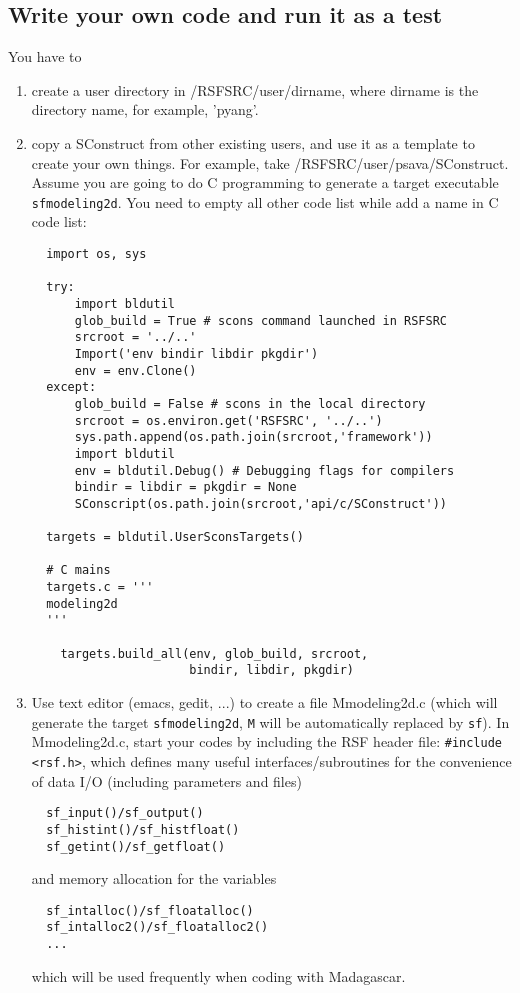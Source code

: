 \subsection{Write your own code and run it as a test}
You have to
\begin{enumerate}
 \item create a user directory in /RSFSRC/user/dirname, where dirname is the directory name, for example, 'pyang'.
 \item copy a SConstruct from other existing users, and use it as a template to create your own things. For example, take /RSFSRC/user/psava/SConstruct. Assume you are going to do C programming to generate a target executable \texttt{sfmodeling2d}. You need to empty all other code list while add a name in C code list:
\lstset{language=python,numbers=left,numberstyle=\tiny,showstringspaces=false,frame=single}
\begin{lstlisting}
  import os, sys

  try:
      import bldutil
      glob_build = True # scons command launched in RSFSRC
      srcroot = '../..' 
      Import('env bindir libdir pkgdir')
      env = env.Clone()
  except:
      glob_build = False # scons in the local directory
      srcroot = os.environ.get('RSFSRC', '../..')
      sys.path.append(os.path.join(srcroot,'framework'))
      import bldutil
      env = bldutil.Debug() # Debugging flags for compilers
      bindir = libdir = pkgdir = None
      SConscript(os.path.join(srcroot,'api/c/SConstruct'))

  targets = bldutil.UserSconsTargets()

  # C mains
  targets.c = '''
  modeling2d
  '''

    targets.build_all(env, glob_build, srcroot, 
                      bindir, libdir, pkgdir)
\end{lstlisting}

 \item Use text editor (emacs, gedit, ...) to create a file Mmodeling2d.c (which will generate the target \texttt{sfmodeling2d}, \texttt{M} will be automatically replaced by \texttt{sf}). In Mmodeling2d.c, start your codes by  including the RSF header file: \texttt{\#include <rsf.h>}, which defines many useful interfaces/subroutines for the convenience of data I/O (including parameters and files)
 \begin{verbatim}
  sf_input()/sf_output()
  sf_histint()/sf_histfloat()
  sf_getint()/sf_getfloat()
 \end{verbatim}
 and memory allocation for the variables
 \begin{verbatim}  
  sf_intalloc()/sf_floatalloc()
  sf_intalloc2()/sf_floatalloc2()
  ...
 \end{verbatim}
 which will be used frequently when coding with Madagascar.


\end{enumerate}
